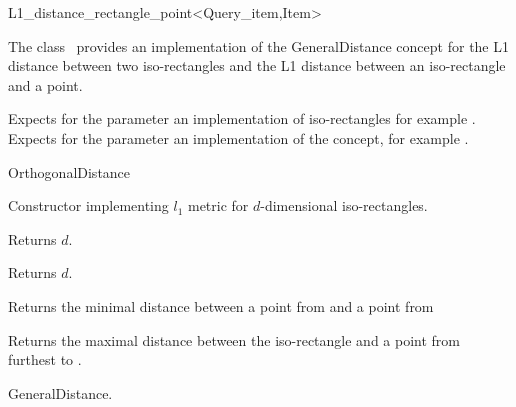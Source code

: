 

\begin{ccRefClass}{L1_distance_rectangle_point<Query_item,Item>}  %


\ccDefinition

The class \ccRefName\ provides an implementation of the GeneralDistance concept
for the L1 distance between two iso-rectangles and the L1 distance between an iso-rectangle
and a point.


\ccParameters

Expects for the parameter 
 an implementation of iso-rectangles
for example .
Expects for the parameter  an implementation of the
 concept, for example .

\ccIsModel

OrthogonalDistance

\ccTypes


\ccCreation
{}  %


{Constructor implementing $l_1$ metric for
$d$-dimensional iso-rectangles.}


 {Returns $d$.}

 {Returns $d$.}


{Returns the minimal distance between a point from  and a point from
}

{Returns the maximal distance between the iso-rectangle  and
a point from  furthest to .}


\ccSeeAlso

GeneralDistance.

\end{ccRefClass}


